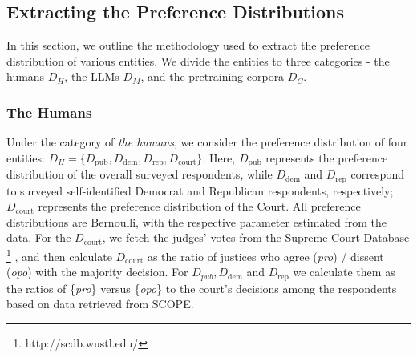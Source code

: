 \subsection{Extracting the Preference Distributions} \label{sec:stage1}
In this section, we outline the methodology used to extract the preference distribution of various entities. We divide the entities to three categories - the humans $D_H$,  the LLMs $D_M$, and the pretraining corpora $D_C$.


\subsubsection{The Humans} 
Under the category of \textit{the humans}, we consider the preference distribution of four entities: $D_{H}=\{D_{\mathrm{pub}},D_{\mathrm{dem}},D_{\mathrm{rep}},D_{\mathrm{court}} \}$. Here, $D_\mathrm{pub}$ represents the preference distribution of the overall surveyed respondents, while \( D_{\mathrm{dem}} \) and \( D_{\mathrm{rep}} \) correspond to surveyed self-identified Democrat and Republican respondents, respectively; $D_\mathrm{court}$ represents the preference distribution of the Court. All preference distributions are Bernoulli, with the respective parameter estimated from the data. For the $D_\mathrm{court}$, we fetch the judges' votes from the Supreme Court Database \cite{spaeth2024supreme}\footnote{http://scdb.wustl.edu/} 
, and then calculate $D_\mathrm{court}$ as the ratio of justices who agree (\textit{pro}) / dissent (\textit{opo}) with the majority decision. For $D_{pub},D_\mathrm{dem}$ and $D_\mathrm{rep}$ we calculate them as the ratios of \{\textit{pro}\} versus \{\textit{opo}\} to the court's decisions among the respondents based on data retrieved from \textsc{SCOPE}. 


